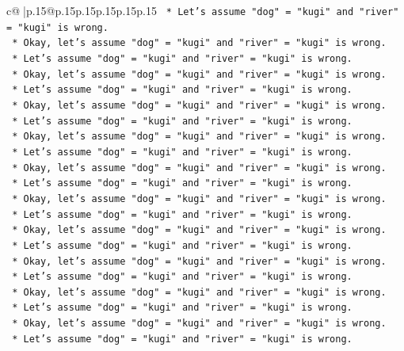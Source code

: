 \documentclass{article}
\begin{document}
{\begin{supertabular}{c@{$\;$}|p{.15\linewidth}@{}p{.15\linewidth}p{.15\linewidth}p{.15\linewidth}p{.15\linewidth}p{.15\linewidth}}
{{{\texttt{        *   Let's assume "dog" = "kugi" and "river" = "kugi" is wrong.} \\
\texttt{        *   Okay, let's assume "dog" = "kugi" and "river" = "kugi" is wrong.} \\
\texttt{        *   Let's assume "dog" = "kugi" and "river" = "kugi" is wrong.} \\
\texttt{        *   Okay, let's assume "dog" = "kugi" and "river" = "kugi" is wrong.} \\
\texttt{        *   Let's assume "dog" = "kugi" and "river" = "kugi" is wrong.} \\
\texttt{        *   Okay, let's assume "dog" = "kugi" and "river" = "kugi" is wrong.} \\
\texttt{        *   Let's assume "dog" = "kugi" and "river" = "kugi" is wrong.} \\
\texttt{        *   Okay, let's assume "dog" = "kugi" and "river" = "kugi" is wrong.} \\
\texttt{        *   Let's assume "dog" = "kugi" and "river" = "kugi" is wrong.} \\
\texttt{        *   Okay, let's assume "dog" = "kugi" and "river" = "kugi" is wrong.} \\
\texttt{        *   Let's assume "dog" = "kugi" and "river" = "kugi" is wrong.} \\
\texttt{        *   Okay, let's assume "dog" = "kugi" and "river" = "kugi" is wrong.} \\
\texttt{        *   Let's assume "dog" = "kugi" and "river" = "kugi" is wrong.} \\
\texttt{        *   Okay, let's assume "dog" = "kugi" and "river" = "kugi" is wrong.} \\
\texttt{        *   Let's assume "dog" = "kugi" and "river" = "kugi" is wrong.} \\
\texttt{        *   Okay, let's assume "dog" = "kugi" and "river" = "kugi" is wrong.} \\
\texttt{        *   Let's assume "dog" = "kugi" and "river" = "kugi" is wrong.} \\
\texttt{        *   Okay, let's assume "dog" = "kugi" and "river" = "kugi" is wrong.} \\
\texttt{        *   Let's assume "dog" = "kugi" and "river" = "kugi" is wrong.} \\
\texttt{        *   Okay, let's assume "dog" = "kugi" and "river" = "kugi" is wrong.} \\
\texttt{        *   Let's assume "dog" = "kugi" and "river" = "kugi" is wrong.} \\
}}}
\end{supertabular}}
\end{document}
